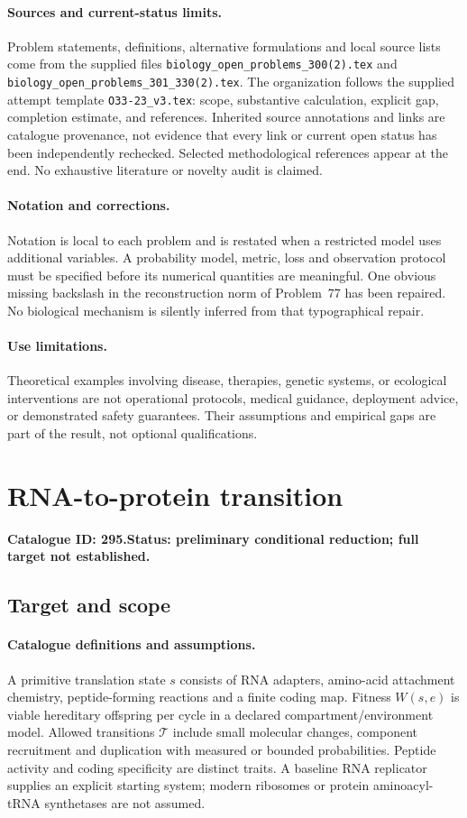 \documentclass[11pt]{article}
\begin{document}
\paragraph{Sources and current-status limits.}
Problem statements, definitions, alternative formulations and local source lists
come from the supplied files
\texttt{biology\_open\_problems\_300(2).tex} and
\texttt{biology\_open\_problems\_301\_330(2).tex}.
The organization follows the supplied attempt template
\texttt{O33-23\_v3.tex}: scope, substantive calculation, explicit gap,
completion estimate, and references. Inherited source annotations and links are
catalogue provenance, not evidence that every link or current open status has
been independently rechecked. Selected methodological references appear at the
end. No exhaustive literature or novelty audit is claimed.

\paragraph{Notation and corrections.}
Notation is local to each problem and is restated when a restricted model uses
additional variables. A probability model, metric, loss and observation protocol
must be specified before its numerical quantities are meaningful. One obvious
missing backslash in the reconstruction norm of Problem~77 has been repaired.
No biological mechanism is silently inferred from that typographical repair.

\paragraph{Use limitations.}
Theoretical examples involving disease, therapies, genetic systems, or ecological
interventions are not operational protocols, medical guidance, deployment advice,
or demonstrated safety guarantees. Their assumptions and empirical gaps are part
of the result, not optional qualifications.

\setcounter{section}{294}
\section{RNA-to-protein transition}
\label{prob:295}
\noindent\textbf{Catalogue ID: 295.}\quad \textbf{Status: preliminary conditional reduction; full target not established.}
\subsection{Target and scope}
\paragraph{Catalogue definitions and assumptions.}
A primitive translation state $s$ consists of RNA adapters, amino-acid attachment chemistry, peptide-forming reactions and a finite coding map. Fitness $W(s,e)$ is viable hereditary offspring per cycle in a declared compartment/environment model. Allowed transitions $\mathcal T$ include small molecular changes, component recruitment and duplication with measured or bounded probabilities. Peptide activity and coding specificity are distinct traits. A baseline RNA replicator supplies an explicit starting system; modern ribosomes or protein aminoacyl-tRNA synthetases are not assumed.
\end{document}
